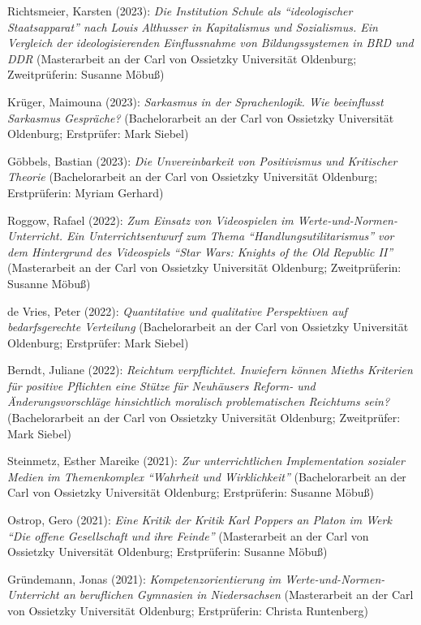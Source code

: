 \documentclass[a4paper,10pt]{article}
\newenvironment{literature}{%
   \parskip6pt\parindent0pt\raggedright
   \def\lititem{\hangindent=1cm\hangafter1}}{%
   \par\ignorespaces}
\begin{document}
\begin{literature}
\lititem Richtsmeier, Karsten (2023): \textit{Die Institution Schule als \enquote{ideologischer Staatsapparat} nach Louis Althusser in Kapitalismus und Sozialismus. Ein Vergleich der ideologisierenden Einflussnahme von Bildungssystemen in BRD und DDR} (Masterarbeit an der Carl von Ossietzky Universität Oldenburg; Zweitprüferin: Susanne Möbuß)

\lititem Krüger, Maimouna (2023): \textit{Sarkasmus in der Sprachenlogik. Wie beeinflusst Sarkasmus Gespräche?} (Bachelorarbeit an der Carl von Ossietzky Universität Oldenburg; Erstprüfer: Mark Siebel)

\lititem Göbbels, Bastian (2023): \textit{Die Unvereinbarkeit von Positivismus und Kritischer Theorie} (Bachelorarbeit an der Carl von Ossietzky Universität Oldenburg; Erstprüferin: Myriam Gerhard)

\lititem Roggow, Rafael (2022): \textit{Zum Einsatz von Videospielen im Werte-und-Normen-Unterricht. Ein Unterrichtsentwurf zum Thema \enquote{Handlungsutilitarismus} vor dem Hintergrund des Videospiels \enquote{Star Wars: Knights of the Old Republic II}} (Masterarbeit an der Carl von Ossietzky Universität Oldenburg; Zweitprüferin: Susanne Möbuß)

\lititem de Vries, Peter (2022): \textit{Quantitative und qualitative Perspektiven auf bedarfsgerechte Verteilung} (Bachelorarbeit an der Carl von Ossietzky Universität Oldenburg; Erstprüfer: Mark Siebel)

\lititem Berndt, Juliane (2022): \textit{Reichtum verpflichtet. Inwiefern können Mieths Kriterien für positive Pflichten eine Stütze für Neuhäusers Reform- und Änderungsvorschläge hinsichtlich moralisch problematischen Reichtums sein?} (Bachelorarbeit an der Carl von Ossietzky Universität Oldenburg; Zweitprüfer: Mark Siebel)

\lititem Steinmetz, Esther Mareike (2021): \textit{Zur unterrichtlichen Implementation sozialer Medien im Themenkomplex \enquote{Wahrheit und Wirklichkeit}} (Bachelorarbeit an der Carl von Ossietzky Universität Oldenburg; Erstprüferin: Susanne Möbuß)

\lititem Ostrop, Gero (2021): \textit{Eine Kritik der Kritik Karl Poppers an Platon im Werk \enquote{Die offene Gesellschaft und ihre Feinde}} (Masterarbeit an der Carl von Ossietzky Universität Oldenburg; Erstprüferin: Susanne Möbuß)

\lititem Gründemann, Jonas (2021): \textit{Kompetenzorientierung im Werte-und-Normen-Unterricht an beruflichen Gymnasien in Niedersachsen} (Masterarbeit an der Carl von Ossietzky Universität Oldenburg; Erstprüferin: Christa Runtenberg)


\end{literature}
\end{document}
